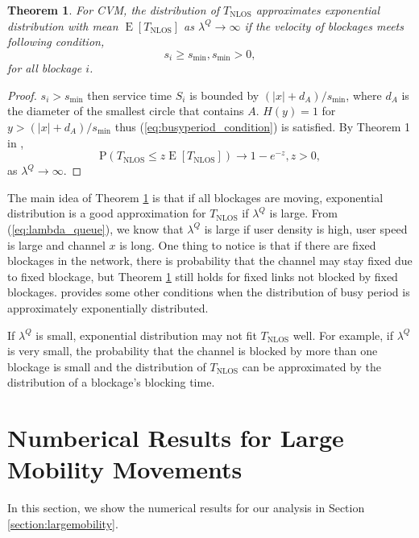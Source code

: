 \documentclass[10pt, conference, letterpaper]{IEEEtran}
\newtheorem{theorem}{Theorem}
\DeclareMathOperator*{\E}{\mathrm{E}}
\DeclareMathOperator*{\NLOS}{\mathrm{NLOS}}
\begin{document}
\begin{theorem}\label{theorem:T_NLOS_exp}
For CVM, the distribution of $T_{\NLOS}$ approximates exponential distribution with mean $\E[T_{\NLOS}]$ as $\lambda^Q\rightarrow \infty$ if the velocity of blockages meets following condition,
\begin{equation}\label{condition:T_NLOS_exp}
s_i\geq s_{\min}, s_{\min}>0,
\end{equation} 
for all blockage $i$.
\end{theorem}

\begin{proof}
$s_i>s_{\min}$ then service time $S_i$ is bounded by $(|x|+d_A)/s_{\min}$, where $d_A$ is the diameter of the smallest circle that contains $A$. $H(y) = 1$ for $y>(|x|+d_A)/s_{\min}$ thus (\ref{eq:busyperiod_condition}) is satisfied. By Theorem 1 in \cite{busyperiod_heavytraffic}, 
\begin{equation*}
\mathrm{P}(T_{\NLOS} \leq z\E[T_{\NLOS}]) \rightarrow 1-e^{-z}, z>0,
\end{equation*} 
as $\lambda^Q\rightarrow \infty$.
\end{proof}

The main idea of Theorem \ref{theorem:T_NLOS_exp} is that if all blockages are moving, exponential distribution is a good approximation for $T_{\NLOS}$ if $\lambda^Q$ is large. 
From (\ref{eq:lambda_queue}), we know that $\lambda^Q$ is large if user density is high, user speed is large and channel $x$ is long. 
One thing to notice is that if there are fixed blockages in the network, there is probability that the channel may stay fixed due to fixed blockage, but Theorem \ref{theorem:T_NLOS_exp} still holds for fixed links not blocked by fixed blockages.
\cite{busyperiod_exponential} provides some other conditions when the distribution of busy period is approximately exponentially distributed.
 
If $\lambda^Q$ is small, exponential distribution may not fit $T_{\NLOS}$ well. For example, if $\lambda^Q$ is very small, the probability that the channel is blocked by more than one blockage is small and the distribution of $T_{\NLOS}$ can be approximated by the distribution of a blockage's blocking time.



\section{Numberical Results for Large Mobility Movements} \label{section:channel_numerical}
In this section, we show the numerical results for our analysis in Section \ref{section:largemobility}. 
\end{document}
